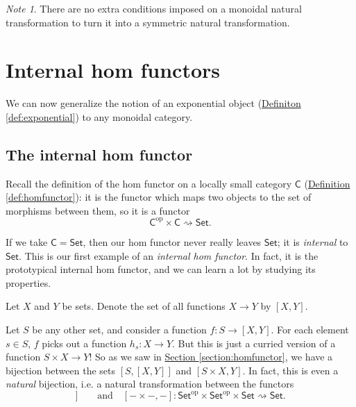 \documentclass[a4paper,10pt]{scrreprt}
\theoremstyle{definition}
\theoremstyle{plain}
\theoremstyle{remark}
\newtheorem{note}{Note}[section]
\begin{document}
\begin{note}
  There are no extra conditions imposed on a monoidal natural transformation to turn it into a symmetric natural transformation. 
\end{note}
\section{Internal hom functors} \label{sec:internalhomfunctors}
We can now generalize the notion of an exponential object (\hyperref[def:exponential]{Definiton \ref*{def:exponential}}) to any monoidal category.
\subsection{The internal hom functor}
Recall the definition of the hom functor on a locally small category $\mathsf{C}$ (\hyperref[def:homfunctor]{Definition \ref*{def:homfunctor}}): it is the functor which maps two objects to the set of morphisms between them, so it is a functor
\begin{equation*}
  \mathsf{C}^{\mathrm{op}} \times \mathsf{C} \rightsquigarrow \mathsf{Set}.
\end{equation*}

If we take $\mathsf{C} = \mathsf{Set}$, then our hom functor never really leaves $\mathsf{Set}$; it is \emph{internal} to $\mathsf{Set}$. This is our first example of an \emph{internal hom functor}. In fact, it is the prototypical internal hom functor, and we can learn a lot by studying its properties. 

Let $X$ and $Y$ be sets. Denote the set of all functions $X \to Y$ by $[X,Y]$. 

Let $S$ be any other set, and consider a function $f\colon S \to [X, Y]$. For each element $s \in S$, $f$ picks out a function $h_{s}\colon X \to Y$. But this is just a curried version of a function $S \times X \to Y$! So as we saw in \hyperref[section:homfunctor]{Section \ref*{section:homfunctor}}, we have a bijection between the sets $[S, [X, Y]]$ and $[S \times X, Y]$. In fact, this is even a \emph{natural} bijection, i.e. a natural transformation between the functors 
\begin{equation*}
  [-,[-,-]]\qquad \text{and}\quad [- \times -, -]\colon \mathsf{Set}^{\mathrm{op}} \times \mathsf{Set}^{\mathrm{op}} \times \mathsf{Set} \rightsquigarrow \mathsf{Set}.
\end{equation*}
\end{document}
